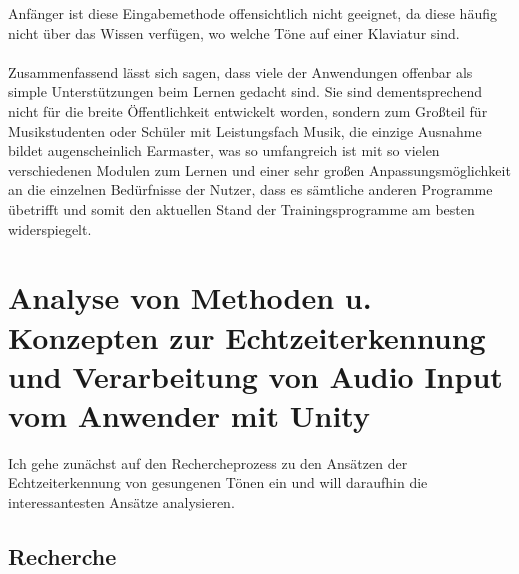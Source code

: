Anfänger ist diese Eingabemethode offensichtlich nicht geeignet, da diese häufig nicht über das Wissen verfügen, wo welche Töne auf einer Klaviatur sind. \\\\
Zusammenfassend lässt sich sagen, dass viele der Anwendungen offenbar als simple Unterstützungen beim Lernen gedacht sind. Sie sind dementsprechend nicht für die breite Öffentlichkeit entwickelt worden, sondern zum Großteil für Musikstudenten oder Schüler mit Leistungsfach Musik, die einzige Ausnahme bildet augenscheinlich Earmaster, was so umfangreich ist mit so vielen verschiedenen Modulen zum Lernen und einer sehr großen Anpassungsmöglichkeit an die einzelnen Bedürfnisse der Nutzer, dass es sämtliche anderen Programme übetrifft und somit den aktuellen Stand der Trainingsprogramme am besten widerspiegelt. 

\section{Analyse von Methoden u. Konzepten zur Echtzeiterkennung und Verarbeitung von Audio Input vom Anwender mit Unity}
Ich gehe zunächst auf den Rechercheprozess zu den Ansätzen der Echtzeiterkennung von gesungenen Tönen ein und will daraufhin die interessantesten Ansätze analysieren. 

\subsection{Recherche}

